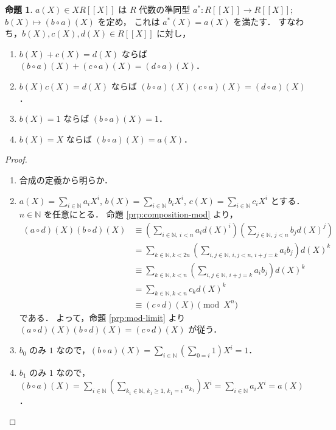 \documentclass{jsarticle}
\newcommand{\N}{\mathbb{N}}
\newcommand{\longto}{\longrightarrow}
\theoremstyle{definition}
\newtheorem{Prp}{命題}
\newenvironment{prp}{\vspace{1ex}\begin{screen}\begin{Prp}}{\end{Prp}\end{screen}}
\newenvironment{prf}{\begin{leftbar}\begin{proof}}{\end{proof}\end{leftbar}}
\begin{document}
\begin{prp}
  \label{prp:composition-hom}
  $a(X) \in X R[[X]]$ は $R$ 代数の準同型 $a^*\colon R[[X]] \longto R[[X]]$; $b(X) \longmapsto (b \circ a)(X)$ を定め，
  これは $a^*(X) = a(X)$ を満たす．
  すなわち，$b(X), c(X), d(X) \in R[[X]]$ に対し，
  \begin{enumerate}[(1)]
    \item $b(X) + c(X) = d(X)$ ならば $(b \circ a)(X) + (c \circ a)(X) = (d \circ a)(X)$．
    \item $b(X) c(X) = d(X)$ ならば $(b \circ a)(X) (c \circ a)(X) = (d \circ a)(X)$．
    \item $b(X) = 1$ ならば $(b \circ a)(X) = 1$．
    \item $b(X) = X$ ならば $(b \circ a)(X) = a(X)$．
  \end{enumerate}
\end{prp}

\begin{prf}
  \begin{enumerate}[(1)]
    \item 合成の定義から明らか．
    \item $a(X) = \sum_{i\in\N} a_i X^i$, $b(X) = \sum_{i\in\N} b_i X^i$, $c(X) = \sum_{i\in\N} c_i X^i$ とする．
        $n \in \N$ を任意にとる．
        命題 \ref{prp:composition-mod} より，
        \begin{align*}
          (a \circ d)(X) (b \circ d)(X)
          &\equiv \left( \sum_{i\in\N,\,i<n} a_i d(X)^i \right) \left( \sum_{j\in\N,\,j<n} b_j d(X)^j \right) \\
          &= \sum_{k\in\N,k<2n} \left( \sum_{i,j\in\N,\,i,j<n,\,i+j=k} a_i b_j \right) d(X)^k \\
          &\equiv \sum_{k\in\N,k<n} \left( \sum_{i,j\in\N,\,i+j=k} a_i b_j \right) d(X)^k \\
          &= \sum_{k\in\N,k<n} c_k d(X)^k \\
          &\equiv (c \circ d)(X) \pmod{X^n}
        \end{align*}
        である．
        よって，命題 \ref{prp:mod-limit} より $(a \circ d)(X) (b \circ d)(X) = (c \circ d)(X)$ が従う．
    \item $b_0$ のみ $1$ なので，$(b \circ a)(X) = \sum_{i\in\N} \left( \sum_{0=i} 1 \right) X^i = 1$．
    \item $b_1$ のみ $1$ なので，$(b \circ a)(X) = \sum_{i\in\N} \left( \sum_{k_1\in\N,\,k_1\ge 1,\,k_1=i} a_{k_1} \right) X^i = \sum_{i\in\N} a_i X^i = a(X)$．
  \end{enumerate}
\end{prf}
\end{document}
